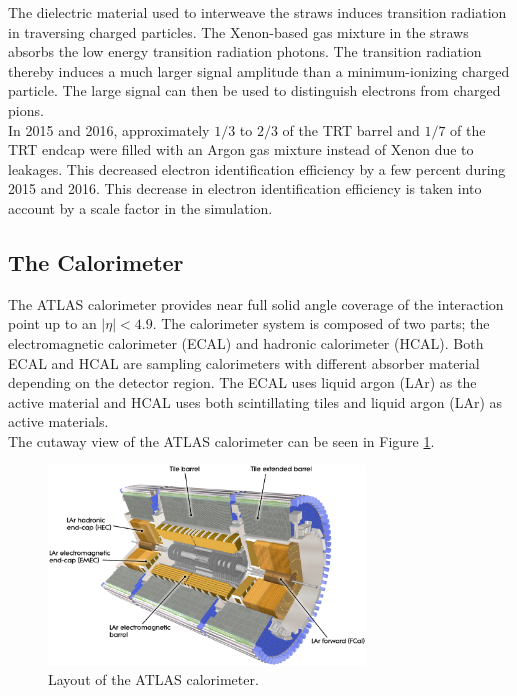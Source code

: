 \indent The dielectric material used to interweave the straws induces transition radiation in traversing charged particles.  The Xenon-based gas mixture in the straws absorbs the low energy transition radiation photons. The transition radiation thereby induces a much larger signal amplitude than a minimum-ionizing charged particle.  The large signal can then be used to distinguish electrons from charged pions.  \\

\indent In 2015 and 2016, approximately $1/3$ to $2/3$ of the TRT barrel and $1/7$ of the TRT endcap were filled with an Argon gas mixture instead of Xenon due to leakages.  This decreased electron identification efficiency by a few percent during 2015 and 2016.  This decrease in electron identification efficiency is taken into account by a scale factor in the simulation.  \\

\subsection{The Calorimeter}
\label{LHC:Calorimeter}

\indent The ATLAS calorimeter provides near full solid angle coverage of the interaction point up to an $|\eta| < 4.9$.  The calorimeter system is composed of two parts; the electromagnetic calorimeter (ECAL) and hadronic calorimeter (HCAL).  Both ECAL and HCAL are sampling calorimeters with different absorber material depending on the detector region.  The ECAL uses liquid argon (LAr) as the active material and HCAL uses both scintillating tiles and liquid argon (LAr) as active materials.  \\

\indent The cutaway view of the ATLAS calorimeter can be seen in Figure \ref{LHC:fig:ATLASCalo}. \\%

\begin{figure}[h!]
\centering
\includegraphics[width=0.75\textwidth, angle=0]{figures/LHC_ATLAS/Calorimeter_d3.eps}
\caption[~Layout of the ATLAS calorimeter]{ Layout of the ATLAS calorimeter.\cite{ATLAS_JINST} \label{LHC:fig:ATLASCalo}}
\end{figure}

